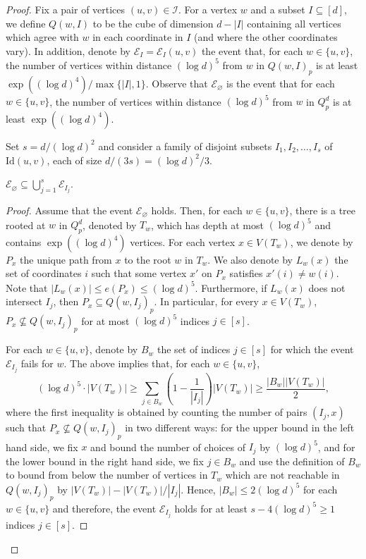 \documentclass[10pt,a4paper]{amsart}
\def\Id{\mathrm{Id}}
\newcommand{\cE}{\mathcal{E}}
\newcommand{\cI}{\mathcal{I}}
\begin{document}
\begin{proof}
Fix a pair of vertices $(u,v)\in \cI$. For a vertex $w$ and a subset $I\subseteq [d]$, we define $Q(w,I)$ to be the cube of dimension $d-|I|$ containing all vertices which agree with $w$ in each coordinate in $I$ (and where the other coordinates vary). 
In addition, denote by $\mathcal{E}_I=\mathcal{E}_I(u,v)$ the event that, for each $w\in \{u,v\}$, the number of vertices within distance $(\log d)^5$ from $w$ in $Q(w,I)_p$ is at least $\exp((\log d)^4)/\max\{|I|,1\}$. Observe that $\cE_{\varnothing}$ is the event that for each $w\in \{u,v\}$, the number of vertices within distance $(\log d)^5$ from $w$ in $Q^d_p$ is at least $\exp((\log d)^4)$.

Set $s=d/(\log d)^2$ and consider a family of disjoint subsets $I_1,I_2,\ldots,I_s$ of $\Id(u,v)$, each of size $d/(3s)=(\log d)^2/3$.
 
\begin{claim}\label{claim:smallerevents}
$\cE_\varnothing\subseteq \bigcup_{j=1}^s \cE_{I_j}$.
\end{claim}
\begin{proof}
Assume that the event $\mathcal{E}_\varnothing$ holds. 
Then, for each $w\in \{u,v\}$, there is a tree rooted at $w$ in $Q^d_p$, denoted by $T_w$, which has depth at most $(\log d)^5$ and contains $\exp((\log d)^4)$ vertices.
For each vertex $x\in V(T_w)$, we denote by $P_x$ the unique path from $x$ to the root $w$ in $T_w$. 
We also denote by $L_w(x)$ the set of coordinates $i$ such that some vertex $x'$ on $P_x$ satisfies $x'(i)\neq w(i)$.
Note that $|L_w(x)|\le e(P_x)\le (\log d)^5$. Furthermore, if $L_w(x)$ does not intersect $I_j$, then $P_x\subseteq Q(w,I_j)_p$.
In particular, for every $x\in V(T_w)$, $P_x\not\subseteq Q(w,I_j)_p$ for at most $(\log d)^5$ indices $j\in [s]$.

For each $w\in \{u,v\}$, denote by $B_w$ the set of indices $j\in [s]$ for which the event $\cE_{I_j}$ fails for $w$. The above implies that, for each $w\in \{u,v\}$,
\[ (\log d)^5 \cdot |V(T_w)|  \ge \sum_{j\in B_w} \left(1-\frac{1}{|I_j|}\right)|V(T_w)|\ge \frac{|B_w||V(T_w)|}{2},\]
where the first inequality is obtained by counting the number of pairs $(I_j,x)$ such that $P_x\not\subseteq Q(w,I_j)_p$ in two different ways: for the upper bound in the left hand side, we fix $x$ and bound the number of choices of $I_j$ by $(\log d)^5$, and for the lower bound in the right hand side, we fix $j\in B_w$ and use the definition of $B_w$ to bound from below the number of vertices in $T_w$ which are not reachable in $Q(w,I_j)_p$ by $|V(T_w)|-|V(T_w)|/|I_j|$.
Hence, $|B_w|\leq 2(\log d)^5$ for each $w\in \{u,v\}$ and therefore, the event $\mathcal{E}_{I_j}$ holds for at least $s-4(\log d)^5\ge 1$ indices $j\in [s]$.    
\end{proof}


\end{proof}
\end{document}
